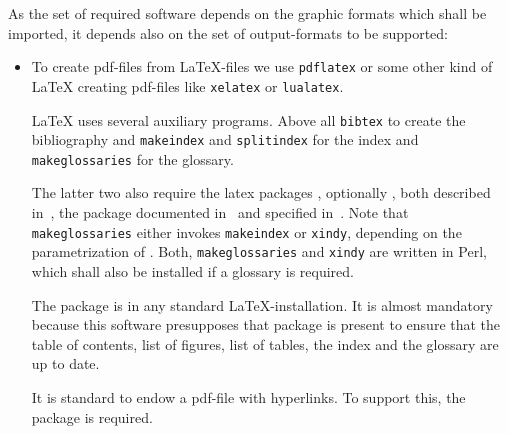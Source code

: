 \documentclass[12pt]{book}
\renewcommand{\index}[1]{ }
\begin{document}
As the set of required software depends on the graphic formats 
which shall be imported, 
it depends also on the set of output-formats 
to be supported: 
%
\begin{itemize}
\item
To create pdf-files from \LaTeX-files we use \texttt{pdflatex} 
or some other kind of \LaTeX{} creating pdf-files 
like \texttt{xelatex} or \texttt{lualatex}. 
\index{pdflatex}\index{xelatex}\index{lualatex} 
\LaTeX{} uses several auxiliary programs. 
Above all \texttt{bibtex} to create the bibliography 
and \texttt{makeindex} and \texttt{splitindex} for the index 
and \texttt{makeglossaries} for the glossary. 
\index{bibtex}\index{makeindex}\index{splitindex}\index{makeglossaries}
The latter two 
also require the latex packages , optionally , 
both described in~\cite{MkidxShIdxP}, 
the package  documented in~\cite{SplitidxP}
and  specified in~\cite{GloP}. 
Note that \texttt{makeglossaries} either invokes \texttt{makeindex} 
or \texttt{xindy}, depending on the parametrization of . 
Both, \texttt{makeglossaries} and \texttt{xindy} are written in Perl, 
which shall also be installed if a glossary is required. 

The package  is in any standard \LaTeX-installation. 
It is almost mandatory 
because this software presupposes that package is present  
to ensure that the table of contents, list of figures, list of tables, 
the index and the glossary are up to date. 

It is standard to endow a pdf-file with hyperlinks. 
To support this, the package  is required. 


\end{itemize}
\end{document}
